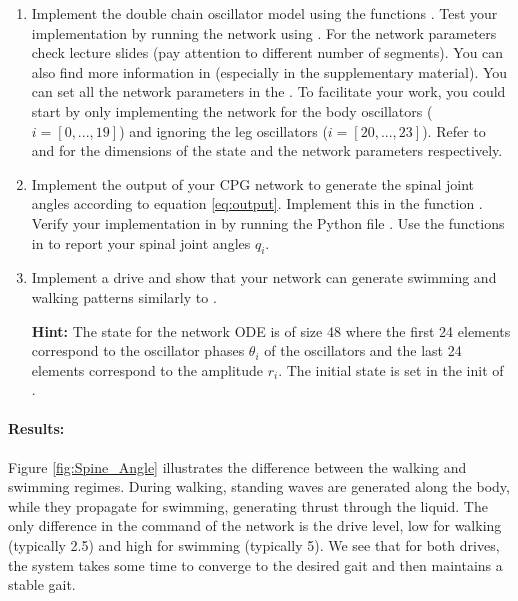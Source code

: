 \documentclass{cmc}
\begin{document}
\begin{enumerate}
\item Implement the double chain oscillator model using the functions
  . Test your implementation by running the
  network using . For the network parameters check
  lecture slides (pay attention to different number of segments). You can also
  find more information in \cite{ijspeert2007swimming} (especially in the
  supplementary material). You can set all the network parameters in the
  . To facilitate your work, you
  could start by only implementing the network for the body oscillators
  ($i=[0, ..., 19]$) and ignoring the leg oscillators ($i=[20, ..., 23]$). Refer
  to  and
  \- for the dimensions of
  the state and the network parameters respectively.

\item Implement the output of your CPG network to generate the spinal joint
  angles according to equation \ref{eq:output}. Implement this in the function
  . Verify your implementation in by running
  the Python file .  Use the functions in
   to report your spinal joint angles $q_i$.

\item Implement a drive and show that your network can generate swimming and
  walking patterns similarly to \cite{ijspeert2007swimming}.

  \textbf{Hint:} The state for the network ODE is of size 48 where the first 24
  elements correspond to the oscillator phases $\theta_i$ of the oscillators and
  the last 24 elements correspond to the amplitude $r_i$. The initial state is
  set in the init of .
\end{enumerate}

\paragraph{Results:}
Figure \ref{fig:Spine_Angle} illustrates the difference between the walking and swimming regimes. During walking, standing waves are generated along the body, while they propagate for swimming, generating thrust through the liquid. The only difference in the command of the network is the drive level, low for walking (typically 2.5) and high for swimming (typically 5). We see that for both drives, the system takes some time to converge to the desired gait and then maintains a stable gait. 
\end{document}

